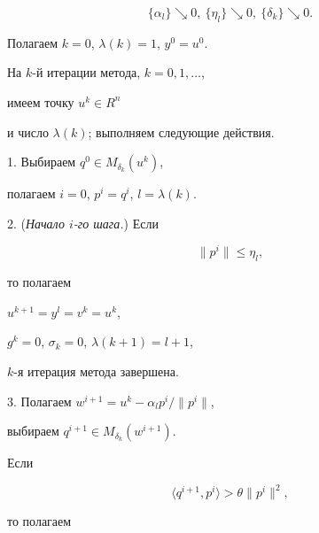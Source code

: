 \begin{equation}


\label{eq:3}


\{\alpha_{l}\}\searrow 0,\ \{\eta _{l}\}\searrow 0,


\ \{\delta _{k}\} \searrow 0.


\end{equation}


Полагаем $k=0$, $\lambda (k)=1$, $y^{0}=u^{0}$.





На $k$-й итерации метода, $k=0,1,\dotsc$,


имеем точку $u^{k}\in R^{n}$


и число $\lambda (k)$; выполняем следующие действия.





1. Выбираем $q^{0} \in M_{\delta_{k}}(u^{k})$,


полагаем $i=0$, $p^{i}=q^{i}$, $l=\lambda (k)$.





2. ({\it Начало $i$-го шага.}) Если


\begin{equation}


\label{eq:4}


\|p^{i}\| \leq \eta _{l},


\end{equation}


то полагаем


$u^{k+1}= y^{l}=v^{k}=u^{k}$,


$g^{k}=0$, $\sigma _{k}=0$, $\lambda (k+1)=l+1$,


$k$-я итерация метода завершена.





3. Полагаем $w^{i+1}= u^{k}-\alpha _{l} p^{i}/ \| p^{i}\|$,


выбираем $q^{i+1} \in M_{\delta_{k}}(w^{i+1})$.


Если


\begin{equation}


\label{eq:5}


\langle q^{i+1}, p^{i} \rangle > \theta \| p^{i}\| ^{2},


\end{equation}


то полагаем


